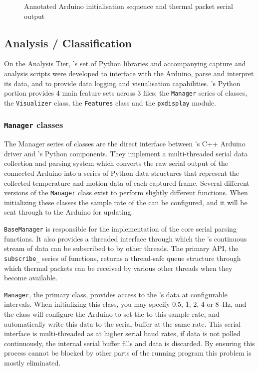 \documentclass[../thesis/thesis.tex]{subfiles}
\begin{document}
\begin{figure}
 \centering

\caption{Annotated Arduino initialisation sequence and thermal packet serial output}
\label{fig:code:initseq}
\end{figure}

\subsection{Analysis / Classification}

On the Analysis Tier, \tarl's set of Python libraries and accompanying capture and analysis scripts were developed to interface with the Arduino, parse and interpret its data, and to provide data logging and visualisation capabilities. \tarl's Python portion provides 4 main feature sets across 3 files; the \texttt{Manager} series of classes, the \texttt{Visualizer} class, the \texttt{Features} class and the \texttt{pxdisplay} module.

\subsubsection*{\texttt{Manager} classes}
The Manager series of classes are the direct interface between \tarl's C++ Arduino driver and \tarl's Python components. They implement a multi-threaded serial data collection and parsing system which converts the raw serial output of the connected Arduino into a series of Python data structures that represent the collected temperature and motion data of each captured frame. Several different versions of the \texttt{Manager} class exist to perform slightly different functions. When initializing these classes the sample rate of the \mlx can be configured, and it will be sent through to the Arduino for updating.

\texttt{BaseManager} is responsible for the implementation of the core serial parsing functions. It also provides a threaded interface through which the \mlx's continuous stream of data can be subscribed to by other threads. The primary API, the \texttt{subscribe\_} series of functions, returns a thread-safe queue structure through which thermal packets can be received by various other threads when they become available.

\texttt{Manager}, the primary class, provides access to the \mlx's data at configurable intervals. When initializing this class, you may specify 0.5, 1, 2, 4 or 8~Hz, and the class will configure the Arduino to set the \mlx to this sample rate, and automatically write this data to the serial buffer at the same rate. This serial interface is multi-threaded as at higher serial baud rates, if data is not polled continuously, the internal serial buffer fills and data is discarded. By ensuring this process cannot be blocked by other parts of the running program this problem is mostly eliminated. 
\end{document}
